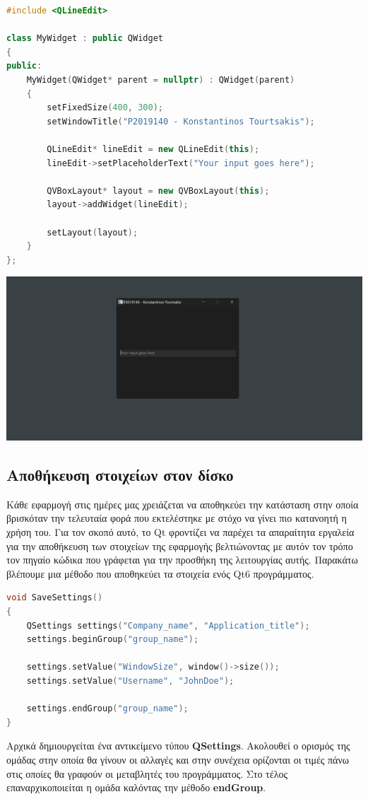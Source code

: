 \begin{lstlisting}[language=C++, style=cppstyle]
#include <QLineEdit>

class MyWidget : public QWidget 
{
public:
    MyWidget(QWidget* parent = nullptr) : QWidget(parent) 
    {
        setFixedSize(400, 300);
        setWindowTitle("P2019140 - Konstantinos Tourtsakis");

        QLineEdit* lineEdit = new QLineEdit(this);
        lineEdit->setPlaceholderText("Your input goes here");
        
        QVBoxLayout* layout = new QVBoxLayout(this);
        layout->addWidget(lineEdit);

        setLayout(layout);
    }
};
\end{lstlisting}
\includegraphics[width=1.0\textwidth]{./images/QLineEdit.png}


\subsection{Αποθήκευση στοιχείων στον δίσκο}
Κάθε εφαρμογή στις ημέρες μας χρειάζεται να αποθηκεύει την κατάσταση στην οποία
βρισκόταν την τελευταία φορά που εκτελέστηκε με στόχο να γίνει πιο κατανοητή η
χρήση του. Για τον σκοπό αυτό, το Qt φροντίζει να παρέχει τα απαραίτητα εργαλεία
για την αποθήκευση των στοιχείων της εφαρμογής βελτιώνοντας με αυτόν τον τρόπο
τον πηγαίο κώδικα που γράφεται για την προσθήκη της λειτουργίας αυτής. Παρακάτω
βλέπουμε μια μέθοδο που αποθηκεύει τα στοιχεία ενός Qt6 προγράμματος.


\begin{lstlisting}[language=C++, style=cppstyle]
void SaveSettings()
{
    QSettings settings("Company_name", "Application_title");
    settings.beginGroup("group_name");

    settings.setValue("WindowSize", window()->size());
    settings.setValue("Username", "JohnDoe");

    settings.endGroup("group_name");
}

\end{lstlisting}
Αρχικά δημιουργείται ένα αντικείμενο τύπου \textbf{QSettings}. Ακολουθεί ο ορισμός
της ομάδας στην οποία θα γίνουν οι αλλαγές και στην συνέχεια ορίζονται
οι τιμές πάνω στις οποίες θα γραφούν οι μεταβλητές του προγράμματος. Στο τέλος
επαναρχικοποιείται η ομάδα καλόντας την μέθοδο \textbf{endGroup}.

